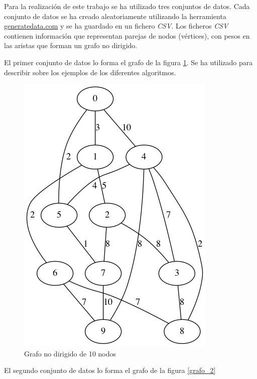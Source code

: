 Para la realización de este trabajo se ha utilizado tres conjuntos de datos. Cada conjunto de datos se ha creado aleatoriamente utilizando la herramienta \href{https://www.generatedata.com/}{generatedata.com} y se ha guardado en un fichero \textit{CSV}. Los ficheros \textit{CSV} contienen información que representan parejas de nodos (vértices), con pesos en las aristas que forman un grafo no dirigido.

El primer conjunto de datos lo forma el grafo de la figura \ref{grafo_1}. Se ha utilizado para describir sobre los ejemplos de los diferentes algoritmos. 

\renewcommand{\figurename}{Figura}
\begin{figure}[h]
	\centering
	\includegraphics[scale=0.4]{../dataset/dataset}
	\vspace{1mm}
	\caption{Grafo no dirigido de 10 nodos}
	\label{grafo_1}
\end{figure}


El segundo conjunto de datos lo forma el grafo de la figura \ref{grafo_2}

